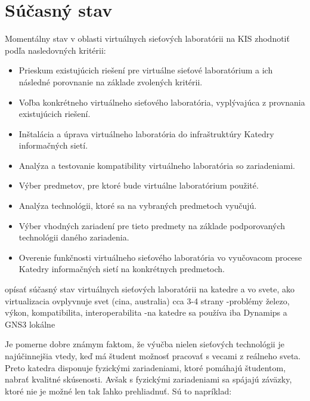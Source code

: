 \chapter{Súčasný stav}

Momentálny stav v oblasti virtuálnych sieťových laboratórii na KIS zhodnotiť podľa nasledovných kritérii:

\begin{itemize}[noitemsep]
    \item Prieskum existujúcich riešení pre virtuálne sieťové laboratórium a ich následné porovnanie na základe zvolených kritérii.
    \item Voľba konkrétneho virtuálneho sieťového laboratória, vyplývajúca z provnania existujúcich riešení.
    \item Inštalácia a úprava virtuálneho laboratória do infraštruktúry Katedry informačných sietí.
    \item Analýza a testovanie kompatibility virtuálneho laboratória so zariadeniami.
    \item Výber predmetov, pre ktoré bude virtuálne laboratórium použité.
    \item Analýza technológii, ktoré sa na vybraných predmetoch vyučujú.
    \item Výber vhodných zariadení pre tieto predmety na základe podporovaných technológii daného zariadenia.
    \item Overenie funkčnosti virtuálneho sieťového laboratória vo vyučovacom procese Katedry informačných sietí na konkrétnych predmetoch.
\end{itemize}

opísať súčasný stav virtuálnych sieťových laboratórii na katedre a vo svete, ako virtualizacia ovplyvnuje svet (cina, australia) cca 3-4 strany
    -problémy železo, výkon, kompatibilita, interoperabilita
    -na katedre sa používa iba Dynamips a GNS3 lokálne

Je pomerne dobre známym faktom, že výučba nielen sieťových technológii je najúčinnejšia vtedy, keď má študent možnosť pracovať s vecami z reálneho sveta. Preto katedra disponuje fyzickými zariadeniami, ktoré pomáhajú študentom, nabrať kvalitné skúsenosti. Avšak s fyzickými zariadeniami sa spájajú záväzky, ktoré nie je možné len tak ľahko prehliadnuť. Sú to napríklad:


